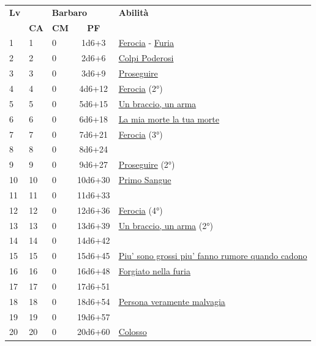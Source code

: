 {\begin{multicols}{2}

\noindent\begin{tabularx}{\linewidth}{p{0.3cm}|p{0.3cm}p{0.3cm}c|X|}
	\toprule
 \rowcolor{gray!20}	\textbf{Lv} & \multicolumn{3}{c|}{\textbf{Barbaro}} & \textbf{Abilità} \\
& \centering\arraybackslash \textbf{CA} & \centering\arraybackslash \textbf{CM} & \centering\arraybackslash \textbf{PF} & \\
	\toprule
	1 &1	& 0	&	1d6+3	&\hyperlink{Ferocia}{Ferocia} - \hyperlink{Furia}{Furia}\\
 \rowcolor{gray!20}2	&	2	& 0	&	2d6+6	&\hyperlink{Colpi Poderosi}{Colpi Poderosi}\\
	3	&	3	& 0	&	3d6+9	&\hyperlink{Proseguire}{Proseguire}\\
 \rowcolor{gray!20}4	&	4	& 0	&	4d6+12	&\hyperlink{Ferocia}{Ferocia} (2°)\\
	5	&	5	& 0	&	5d6+15	&\hyperlink{Un braccio, un arma}{Un braccio, un arma}\\
 \rowcolor{gray!20}6	&	6	& 0	&	6d6+18	&\hyperlink{La mia morte la tua morte}{La mia morte la tua morte}\\
	7	&	7	& 0	&	7d6+21	&\hyperlink{Ferocia}{Ferocia} (3°)\\
 \rowcolor{gray!20}8	&	8	& 0	&	8d6+24	&\\
	9	&	9	& 0	&	9d6+27	&\hyperlink{Proseguire}{Proseguire} (2°)\\
 \rowcolor{gray!20}10	&	10	& 0	&	10d6+30	&\hyperlink{Primo Sangue}{Primo Sangue}\\
	11	&	11	& 0	&	11d6+33	&\\
 \rowcolor{gray!20}12	&	12	& 0	&	12d6+36	&\hyperlink{Ferocia}{Ferocia} (4°)\\
	13	&	13	& 0	&	13d6+39	&\hyperlink{Un braccio, un arma}{Un braccio, un arma} (2°)\\
 \rowcolor{gray!20}14	&	14	& 0	&	14d6+42	&\\
	15	&	15	& 0	&	15d6+45	&\hyperlink{Piu' sono grossi piu' fanno rumore quando cadono}{Piu' sono grossi piu' fanno rumore quando cadono}\\
 \rowcolor{gray!20}16	&	16	& 0	&	16d6+48	&\hyperlink{Forgiato nella furia}{Forgiato nella furia}\\
	17	&	17	& 0	&	17d6+51	&\\
 \rowcolor{gray!20}18	&	18	& 0	&	18d6+54	&\hyperlink{Persona veramente malvagia}{Persona veramente malvagia}\\
	19	&	19	& 0	&	19d6+57	&\\
 \rowcolor{gray!20}20	&	20	& 0	&	20d6+60	&\hyperlink{Colosso}{Colosso}\\
\end{tabularx}


\end{multicols}}
